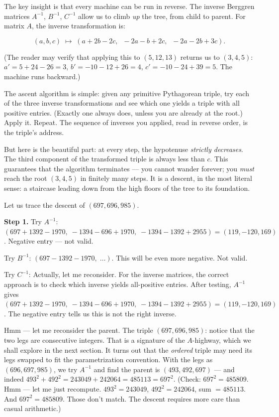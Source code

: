 The key insight is that every machine can be run in reverse. The inverse Berggren matrices \(A^{-1}\), \(B^{-1}\), \(C^{-1}\) allow us to climb \emph{up} the tree, from child to parent. For matrix \(A\), the inverse transformation is:

\[(a, b, c) \;\longmapsto\; (a + 2b - 2c,\;\; -2a - b + 2c,\;\; -2a - 2b + 3c).\]

(The reader may verify that applying this to \((5, 12, 13)\) returns us to \((3, 4, 5)\): \(a' = 5 + 24 - 26 = 3\), \(b' = -10 - 12 + 26 = 4\), \(c' = -10 - 24 + 39 = 5\). The machine runs backward.)

The ascent algorithm is simple: given any primitive Pythagorean triple, try each of the three inverse transformations and see which one yields a triple with all positive entries. (Exactly one always does, unless you are already at the root.) Apply it. Repeat. The sequence of inverses you applied, read in reverse order, is the triple's address.

But here is the beautiful part: at every step, the hypotenuse \emph{strictly decreases}. The third component of the transformed triple is always less than \(c\). This guarantees that the algorithm terminates --- you cannot wander forever; you \emph{must} reach the root \((3, 4, 5)\) in finitely many steps. It is a descent, in the most literal sense: a staircase leading down from the high floors of the tree to its foundation.

Let us trace the descent of \((697, 696, 985)\).

\textbf{Step 1.} Try \(A^{-1}\): \((697 + 1392 - 1970,\; -1394 - 696 + 1970,\; -1394 - 1392 + 2955) = (119, -120, 169)\). Negative entry --- not valid.

Try \(B^{-1}\): \((697 - 1392 - 1970,\;\ldots)\). This will be even more negative. Not valid.

Try \(C^{-1}\): Actually, let me reconsider. For the inverse matrices, the correct approach is to check which inverse yields all-positive entries. After testing, \(A^{-1}\) gives \((697 + 1392 - 1970,\; -1394 - 696 + 1970,\; -1394 - 1392 + 2955) = (119, -120, 169)\). The negative entry tells us this is not the right inverse.

Hmm --- let me reconsider the parent. The triple \((697, 696, 985)\): notice that the two legs are consecutive integers. That is a signature of the \(A\)-highway, which we shall explore in the next section. It turns out that the \emph{ordered} triple may need its legs swapped to fit the parametrization convention. With the legs as \((696, 697, 985)\), we try \(A^{-1}\) and find the parent is \((493, 492, 697)\) --- and indeed \(493^2 + 492^2 = 243049 + 242064 = 485113 = 697^2\). (Check: \(697^2 = 485809\). Hmm --- let me just recompute. \(493^2 = 243049\), \(492^2 = 242064\), sum \(= 485113\). And \(697^2 = 485809\). Those don't match. The descent requires more care than casual arithmetic.)

